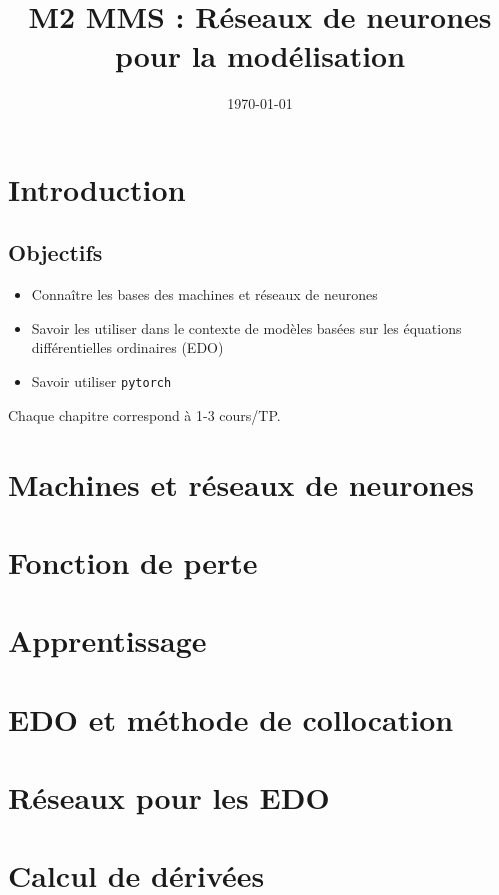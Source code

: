 \documentclass[11pt,a4paper]{article}
\title{M2 MMS : Réseaux de neurones pour la modélisation}
\author{}
\date{\today}
\begin{document}

\maketitle
\tableofcontents
%
\section*{Introduction}\label{sec:}
%
\subsection*{Objectifs}\label{subsec:}
%
\begin{itemize}
\item Connaître les bases des machines et réseaux de neurones
\item Savoir les utiliser dans le contexte de modèles basées sur les équations différentielles ordinaires (EDO)
\item Savoir utiliser \texttt{pytorch}
\end{itemize}
%
Chaque chapitre correspond à 1-3 cours/TP.
%
\section{Machines et réseaux de neurones}\label{sec:}
%
%
%
\section{Fonction de perte}\label{sec:}
%
%
%
\section{Apprentissage}\label{sec:}
%
%
%
\section{EDO et méthode de collocation}\label{sec:}
%
%
\section{Réseaux pour les EDO}\label{sec:}
%
%
\section{Calcul de dérivées}\label{sec:}
%
%



\end{document}
